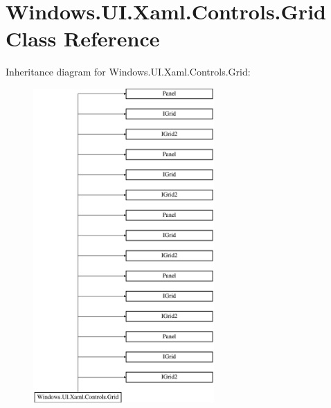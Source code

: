 \hypertarget{class_windows_1_1_u_i_1_1_xaml_1_1_controls_1_1_grid}{}\section{Windows.\+U\+I.\+Xaml.\+Controls.\+Grid Class Reference}
\label{class_windows_1_1_u_i_1_1_xaml_1_1_controls_1_1_grid}
Inheritance diagram for Windows.\+U\+I.\+Xaml.\+Controls.\+Grid\+:\begin{figure}[H]
\begin{center}
\leavevmode
\includegraphics[height=12.000000cm]{class_windows_1_1_u_i_1_1_xaml_1_1_controls_1_1_grid}
\end{center}
\end{figure}
